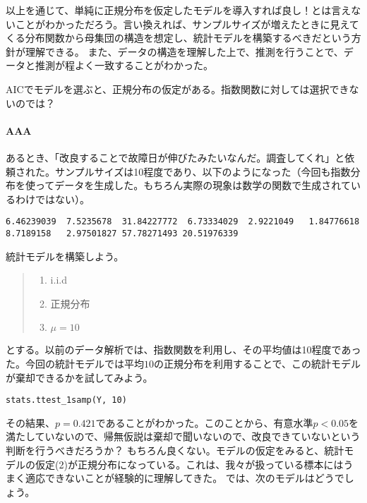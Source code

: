\documentclass[a4paper,11pt,dvipdfmx]{jsarticle}
\begin{document}
以上を通じて、単純に正規分布を仮定したモデルを導入すれば良し！とは言えないことがわかっただろう。言い換えれば、サンプルサイズが増えたときに見えてくる分布関数から母集団の構造を想定し、統計モデルを構築するべきだという方針が理解できる。
また、データの構造を理解した上で、推測を行うことで、データと推測が程よく一致することがわかった。


AICでモデルを選ぶと、正規分布の仮定がある。指数関数に対しては選択できないのでは？ 
\fi




\paragraph{AAA}
あるとき、「改良することで故障日が伸びたみたいなんだ。調査してくれ」と依頼された。サンプルサイズは10程度であり、以下のようになった（今回も指数分布を使ってデータを生成した。もちろん実際の現象は数学の関数で生成されているわけではない）。

\begin{lstlisting}
6.46239039  7.5235678  31.84227772  6.73334029  2.9221049   1.84776618  8.7189158   2.97501827 57.78271493 20.51976339
\end{lstlisting}

統計モデルを構築しよう。
\begin{quote}
    \begin{enumerate}[(1)]
\item i.i.d
\item 正規分布
\item $\mu=10$
\end{enumerate}
\end{quote}

とする。以前のデータ解析では、指数関数を利用し、その平均値は10程度であった。今回の統計モデルでは平均$10$の正規分布を利用することで、この統計モデルが棄却できるかを試してみよう。



\begin{lstlisting}
stats.ttest_1samp(Y, 10)
\end{lstlisting}




その結果、$p=0.421$であることがわかった。このことから、有意水準$p<0.05$を満たしていないので、帰無仮説は棄却で聞いないので、改良できていないという判断を行うべきだろうか？
もちろん良くない。モデルの仮定をみると、統計モデルの仮定(2)が正規分布になっている。これは、我々が扱っている標本にはうまく適応できないことが経験的に理解してきた。
では、次のモデルはどうでしょう。
\end{document}
